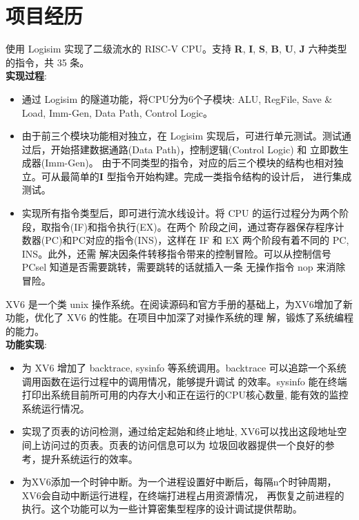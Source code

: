 \documentclass{resume}
\begin{document}
\section{项目经历}
  使用 Logisim 实现了二级流水的 RISC-V CPU。支持 \textbf{R}, \textbf{I}, \textbf{S}, 
    \textbf{B}, \textbf{U}, \textbf{J} 六种类型的指令，共 35 条。 
 \\   \textbf{实现过程}:  
  \begin{itemize}
    \item 通过 Logisim 的隧道功能，将CPU分为6个子模块: ALU, RegFile,  
    Save \& Load, Imm-Gen, Data Path, Control Logic。
    \item 由于前三个模块功能相对独立，在 Logisim 实现后，可进行单元测试。测试通过后，开始搭建数据通路(Data Path)，控制逻辑(Control Logic) 和 立即数生成器(Imm-Gen)。
    由于不同类型的指令，对应的后三个模块的结构也相对独立。可从最简单的\textbf{I} 型指令开始构建。完成一类指令结构的设计后，
    进行集成测试。 
    \item 实现所有指令类型后，即可进行流水线设计。将 CPU 的运行过程分为两个阶段，取指令(IF)和指令执行(EX)。在两个
    阶段之间，通过寄存器保存程序计数器(PC)和PC对应的指令(INS)，这样在 IF 和 EX 两个阶段有着不同的 PC, INS。此外，还需
    解决因条件转移指令带来的控制冒险。可以从控制信号 PCsel 知道是否需要跳转，需要跳转的话就插入一条 无操作指令 nop 来消除冒险。 

\end{itemize}

  XV6 是一个类 unix 操作系统。在阅读源码和官方手册的基础上，为XV6增加了新功能，优化了 XV6 的性能。在项目中加深了对操作系统的理
  解，锻炼了系统编程的能力。
 \\   \textbf{功能实现}:  
\begin{itemize}
 \item 为 XV6 增加了 backtrace, sysinfo 等系统调用。backtrace 可以追踪一个系统调用函数在运行过程中的调用情况，能够提升调试
 的效率。sysinfo 能在终端打印出系统目前所可用的内存大小和正在运行的CPU核心数量, 能有效的监控系统运行情况。
 \item 实现了页表的访问检测，通过给定起始和终止地址, XV6可以找出这段地址空间上访问过的页表。页表的访问信息可以为
 垃圾回收器提供一个良好的参考，提升系统运行的效率。
 \item 为XV6添加一个时钟中断。为一个进程设置好中断后，每隔n个时钟周期，XV6会自动中断运行进程，在终端打进程占用资源情况，
 再恢复之前进程的执行。这个功能可以为一些计算密集型程序的设计调试提供帮助。
\end{itemize}
\end{document}
